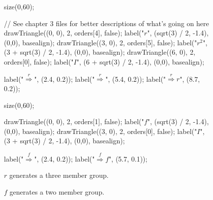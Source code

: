 \documentclass[../textbook.tex]{subfiles}
\begin{document}
\begin{figure}[h]
	\begin{center}
		\begin{minipage}[b]{0.45\textwidth}
			\centering
			\begin{asy}[width=\textwidth]
				size(0,60);

				// See chapter 3 files for better descriptions of what's going on here
				drawTriangle((0, 0), 2, orders[4], false);
				label("$r$", (sqrt(3) / 2, -1.4), (0,0), basealign);
				drawTriangle((3, 0), 2, orders[5], false);
				label("$r^2$", (3 + sqrt(3) / 2, -1.4), (0,0), basealign);
				drawTriangle((6, 0), 2, orders[0], false);
				label("$I$", (6 + sqrt(3) / 2, -1.4), (0,0), basealign);

				label("$\stackrel{r}{\Longrightarrow}$", (2.4, 0.2));
				label("$\stackrel{r}{\Longrightarrow}$", (5.4, 0.2));
				label("$\stackrel{r}{\Longrightarrow}r$", (8.7, 0.2));
			\end{asy}
		\end{minipage}
		\hfill
		\begin{minipage}[b]{0.45\textwidth}
			\centering
			\begin{asy}[width=0.7\textwidth]
				size(0,60);

				drawTriangle((0, 0), 2, orders[1], false);
				label("$f$", (sqrt(3) / 2, -1.4), (0,0), basealign);
				drawTriangle((3, 0), 2, orders[0], false);
				label("$I$", (3 + sqrt(3) / 2, -1.4), (0,0), basealign);

				label("$\stackrel{f}{\Longrightarrow}$", (2.4, 0.2));
				label("$\stackrel{f}{\Longrightarrow}f$", (5.7, 0.1));
			\end{asy}
		\end{minipage}
	\end{center}
	\vspace*{-2\baselineskip}
	\begin{center}
		\begin{minipage}[t]{0.45\textwidth}
			\caption{${r}$ generates a three member group.}
			\label{fig:successive_rotations}
		\end{minipage}
		\hfill
		\begin{minipage}[t]{0.45\textwidth}
			\caption{${f}$ generates a two member group.}
			\label{fig:flips}
		\end{minipage}
	\end{center}
\end{figure}
\end{document}
